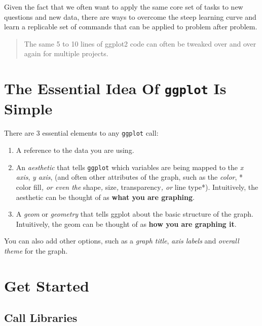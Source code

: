 \documentclass[
  letterpaper,
  DIV=11,
  numbers=noendperiod]{scrreprt}
\providecommand{\tightlist}{%
  \setlength{\itemsep}{0pt}\setlength{\parskip}{0pt}}\usepackage{longtable,booktabs,array}
\begin{document}
Given the fact that we often want to apply the same core set of tasks to
new questions and new data, there are ways to overcome the steep
learning curve and learn a replicable set of commands that can be
applied to problem after problem.

\begin{quote}
The same 5 to 10 lines of ggplot2 code can often be tweaked over and
over again for multiple projects.
\end{quote}

\hypertarget{the-essential-idea-of-ggplot-is-simple}{%
\section{\texorpdfstring{The Essential Idea Of \texttt{ggplot} Is
Simple}{The Essential Idea Of ggplot Is Simple}}\label{the-essential-idea-of-ggplot-is-simple}}

There are 3 essential elements to any \texttt{ggplot} call:

\begin{enumerate}
\def\labelenumi{\arabic{enumi}.}
\tightlist
\item
  A reference to the data you are using.
\item
  An \emph{aesthetic} that tells \texttt{ggplot} which variables are
  being mapped to the \emph{x axis}, \emph{y axis}, (and often other
  attributes of the graph, such as the \emph{color}, * color fill\emph{,
  or even the }shape\emph{, }size\emph{, }transparency\emph{, or }line
  type*). Intuitively, the aesthetic can be thought of as \textbf{what
  you are graphing}.
\item
  A \emph{geom} or \emph{geometry} that tells ggplot about the basic
  structure of the graph. Intuitively, the geom can be thought of as
  \textbf{how you are graphing it}.
\end{enumerate}

You can also add other options, such as a \emph{graph title}, \emph{axis
labels} and \emph{overall theme} for the graph.

\hypertarget{get-started}{%
\section{Get Started}\label{get-started}}

\hypertarget{call-libraries}{%
\subsection{Call Libraries}\label{call-libraries}}
\end{document}
